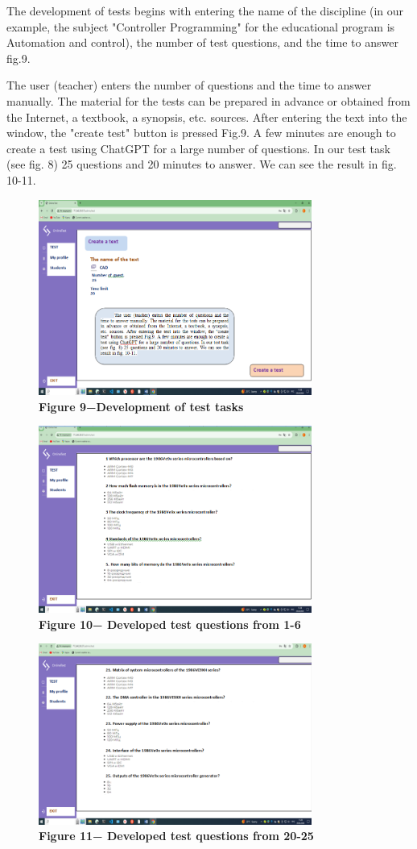 \begin{multicols}{2}
The development of tests begins with entering the name of the discipline
(in our example, the subject "Controller Programming" for the
educational program is Automation and control), the number of test
questions, and the time to answer fig.9.

The user (teacher) enters the number of questions and the time to answer
manually. The material for the tests can be prepared in advance or
obtained from the Internet, a textbook, a synopsis, etc. sources. After
entering the text into the window, the "create test" button is pressed
Fig.9. A few minutes are enough to create a test using ChatGPT for a
large number of questions. In our test task (see fig. 8) 25 questions
and 20 minutes to answer. We can see the result in fig. 10-11.
\end{multicols}

\begin{figure}[H]
	\centering
	\includegraphics[height=0.35\textwidth, width=0.8\textwidth]{assets/134}
	\caption*{\bfseries Figure 9−Development of test tasks}
\end{figure}



\begin{figure}[H]
	\centering
	\includegraphics[height=0.35\textwidth, width=0.8\textwidth]{assets/135}
	\caption*{\bfseries Figure 10− Developed test questions from 1-6}
\end{figure}


\begin{figure}[H]
	\centering
	\includegraphics[height=0.35\textwidth, width=0.8\textwidth]{assets/136}
	\caption*{\bfseries Figure 11− Developed test questions from 20-25}
\end{figure}



